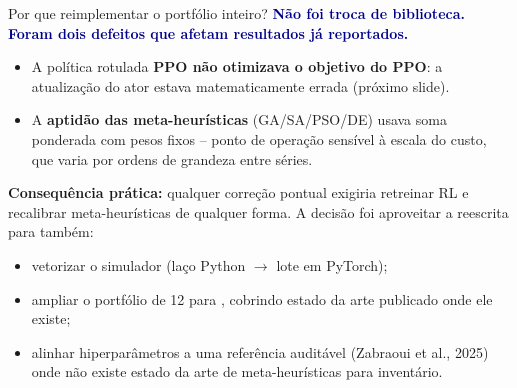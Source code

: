 \begin{frame}{Por que reimplementar o portfólio inteiro?}
  \textbf{\textcolor{darkblue}{Não foi troca de biblioteca. Foram dois defeitos que afetam resultados já reportados.}}
  \vspace{0.4em}

  \begin{itemize}
    \item A política rotulada \textbf{PPO não otimizava o objetivo do PPO}: a
      atualização do ator estava matematicamente errada (próximo slide).
    \item A \textbf{aptidão das meta-heurísticas} (GA/SA/PSO/DE) usava soma
      ponderada com pesos fixos -- ponto de operação sensível à escala do
      custo, que varia por ordens de grandeza entre séries.
  \end{itemize}
  \vspace{0.6em}

  \textbf{Consequência prática:} qualquer correção pontual exigiria retreinar
  RL e recalibrar meta-heurísticas de qualquer forma. A decisão foi
  aproveitar a reescrita para também:
  \begin{itemize}
    \item vetorizar o simulador (laço Python $\rightarrow$ lote em PyTorch);
    \item ampliar o portfólio de 12 para , cobrindo
      estado da arte publicado onde ele existe;
    \item alinhar hiperparâmetros a uma referência auditável (Zabraoui et
      al., 2025) onde não existe estado da arte de meta-heurísticas para
      inventário.
  \end{itemize}

\end{frame}
